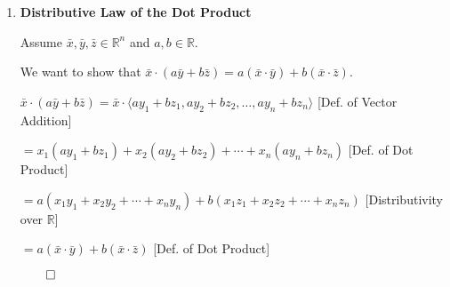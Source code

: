 \begin{proofbox}
\begin{enumerate}[label=\arabic*., series=vecprops]
\quad $\bar{x} \cdot \bar{y} = x_1 y_1 + x_2 y_2 + \cdots + x_n y_n$ \hfill [Def. of Dot Product]

\quad $= y_1 x_1 + y_2 x_2 + \cdots + y_n x_n$ \hfill [Commutativity of Real Numbers]

\quad $= \bar{y} \cdot \bar{x}$ \hfill [Def. of Dot Product]

\hfill $\qed$

\item \textbf{Distributive Law of the Dot Product}

Assume $\bar{x}, \bar{y}, \bar{z} \in \mathbb{R}^n$ and $a, b \in \mathbb{R}$.

We want to show that $\bar{x} \cdot (a\bar{y} + b\bar{z}) = a(\bar{x} \cdot \bar{y}) + b(\bar{x} \cdot \bar{z})$.

\quad $\bar{x} \cdot (a\bar{y} + b\bar{z}) = \bar{x} \cdot \langle ay_1 + bz_1, ay_2 + bz_2, \ldots, ay_n + bz_n \rangle$ \hfill [Def. of Vector Addition]

\quad $= x_1(ay_1 + bz_1) + x_2(ay_2 + bz_2) + \cdots + x_n(ay_n + bz_n)$ \hfill [Def. of Dot Product]

\quad $= a(x_1 y_1 + x_2 y_2 + \cdots + x_n y_n) + b(x_1 z_1 + x_2 z_2 + \cdots + x_n z_n)$ [Distributivity over $\mathbb{R}$]

\quad $= a(\bar{x} \cdot \bar{y}) + b(\bar{x} \cdot \bar{z})$ \hfill [Def. of Dot Product]

\hfill $\qed$

\end{enumerate}
\end{proofbox}
